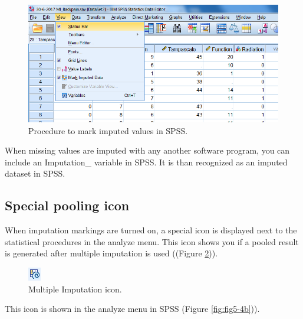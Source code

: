 \documentclass[]{book}
\begin{document}
\begin{figure}

{\centering \includegraphics[width=0.9\linewidth]{images/fig5.2} 

}

\caption{Procedure to mark imputed values in SPSS.}\label{fig:fig5-2}
\end{figure}

When missing values are imputed with any another software program, you
can include an Imputation\_ variable in SPSS. It is than recognized as
an imputed dataset in SPSS.

\subsection{Special pooling icon}\label{special-pooling-icon}

When imputation markings are turned on, a special icon is displayed next
to the statistical procedures in the analyze menu. This icon shows you
if a pooled result is generated after multiple imputation is used
((Figure \ref{fig:fig5-3})).

\begin{figure}

{\centering \includegraphics[width=0.05\linewidth]{images/fig5.3} 

}

\caption{Multiple Imputation icon.}\label{fig:fig5-3}
\end{figure}

This icon is shown in the analyze menu in SPSS (Figure
\ref{fig:fig5-4b})).
\end{document}
